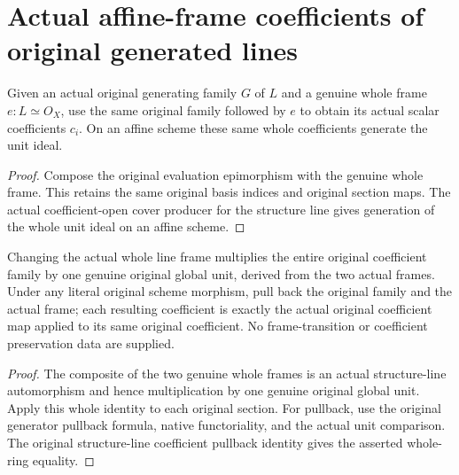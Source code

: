 \section{Actual affine-frame coefficients of original generated lines}

\begin{definition}
\label{def:fc-original-generated-line-frame-coefficients}
\leanok
{}
Given an actual original generating family $G$ of $L$ and a genuine
whole frame $e:L\simeq O_X$, use the same original family followed by
$e$ to obtain its actual scalar coefficients $c_i$. On an affine
scheme these same whole coefficients generate the unit ideal.
\end{definition}
\begin{proof}
Compose the original evaluation epimorphism with the genuine whole
frame. This retains the same original basis indices and original
section maps. The actual coefficient-open cover producer for the
structure line gives generation of the whole unit ideal on an affine
scheme.
\end{proof}

\begin{theorem}
\label{thm:fc-original-generated-line-coefficient-naturality}
\leanok
{}
Changing the actual whole line frame multiplies the entire original
coefficient family by one genuine original global unit, derived from
the two actual frames. Under any literal original scheme morphism,
pull back the original family and the actual frame; each resulting
coefficient is exactly the actual original coefficient map applied
to its same original coefficient. No frame-transition or coefficient
preservation data are supplied.
\end{theorem}
\begin{proof}
The composite of the two genuine whole frames is an actual
structure-line automorphism and hence multiplication by one genuine
original global unit. Apply this whole identity to each original
section. For pullback, use the original generator pullback formula,
native functoriality, and the actual unit comparison. The original
structure-line coefficient pullback identity gives the asserted
whole-ring equality.
\end{proof}

